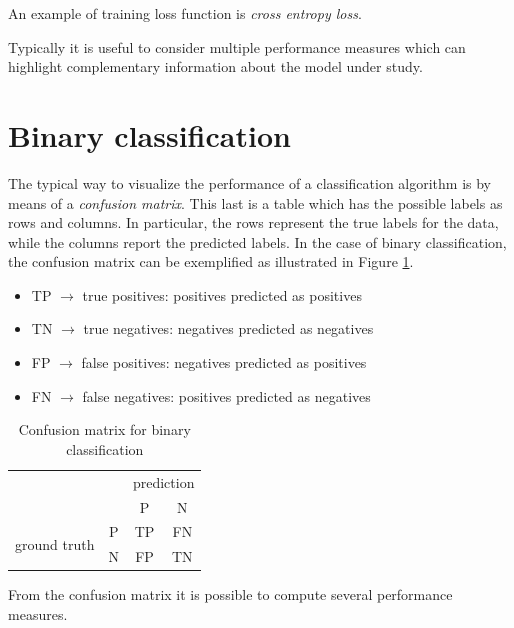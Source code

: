 An example of training loss function is \textit{cross entropy loss}.\newline

Typically it is useful to consider multiple performance measures which can highlight complementary information about the model under study.

\section{Binary classification}
\label{sec::performanceBinaryClassification}
The typical way to visualize the performance of a classification algorithm is by means of a \textit{confusion matrix}. This last is a table which has the possible labels as rows and columns. In particular, the rows represent the true labels for the data, while the columns report the predicted labels. In the case of binary classification, the confusion matrix can be exemplified as illustrated in Figure \ref{fig:binClassConfusionMatrix}.

\begin{itemize}
    \item TP $\rightarrow$ true positives: positives predicted as positives
    \item TN $\rightarrow$ true negatives: negatives predicted as negatives
    \item FP $\rightarrow$ false positives: negatives predicted as positives
    \item FN $\rightarrow$ false negatives: positives predicted as negatives
\end{itemize}


\begin{table}[ht]
    \centering
    \begin{tabular}{cc|cc|}
    \cline{3-4}
     &  & \multicolumn{2}{c|}{prediction} \\ \cline{3-4} 
     &  & \multicolumn{1}{c|}{P} & N \\ \hline
    \multicolumn{1}{|c|}{\multirow{2}{*}{ground truth}} & P & \multicolumn{1}{c|}{TP} & FN \\ \cline{2-4} 
    \multicolumn{1}{|c|}{} & N & \multicolumn{1}{c|}{FP} & TN \\ \hline
    \end{tabular}
    \caption{Confusion matrix for binary classification}
    \label{fig:binClassConfusionMatrix}
\end{table}


From the confusion matrix it is possible to compute several performance measures.

